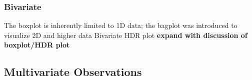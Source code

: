 \documentclass[../main.tex]{subfiles}
\begin{document}
\subsubsection{Bivariate}
\begin{figure}
\end{figure}
The boxplot is inherently limited to 1D data; the bagplot was introduced to
visualize 2D and higher data \cite{rousseeuw1999}
Bivariate HDR plot \cite{hyndman1996} \textbf{expand with discussion of
  boxplot/HDR plot}

\subsection{Multivariate Observations}

\end{document}
